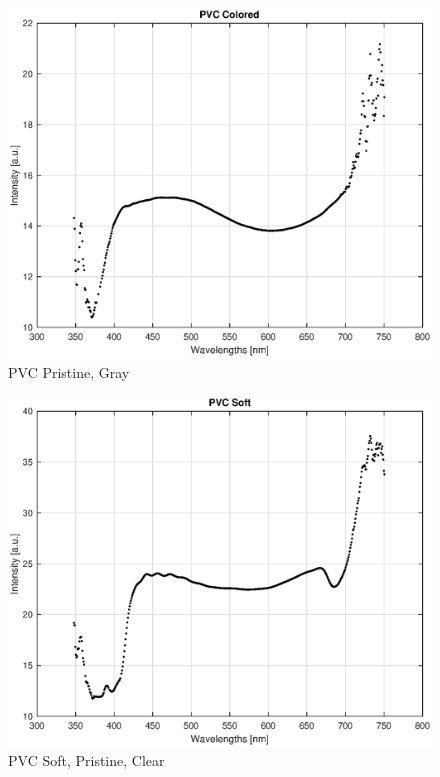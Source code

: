\begin{appendices}
\begin{figure}
    \centering
    \includegraphics[width = 12cm]{Images/appendix/pvc-pristine-colored.eps}
    \caption[$\; \:$PVC Pristine]{PVC Pristine, Gray}
    \label{fig:pvc-gray}
\end{figure}

\begin{figure}
    \centering
    \includegraphics[width = 12cm]{Images/appendix/pvc-soft-pristine-clear.eps}
    \caption[$\; \:$PVC Soft]{PVC Soft, Pristine, Clear}
    \label{fig:pvc-clear}
\end{figure}


\end{appendices}

